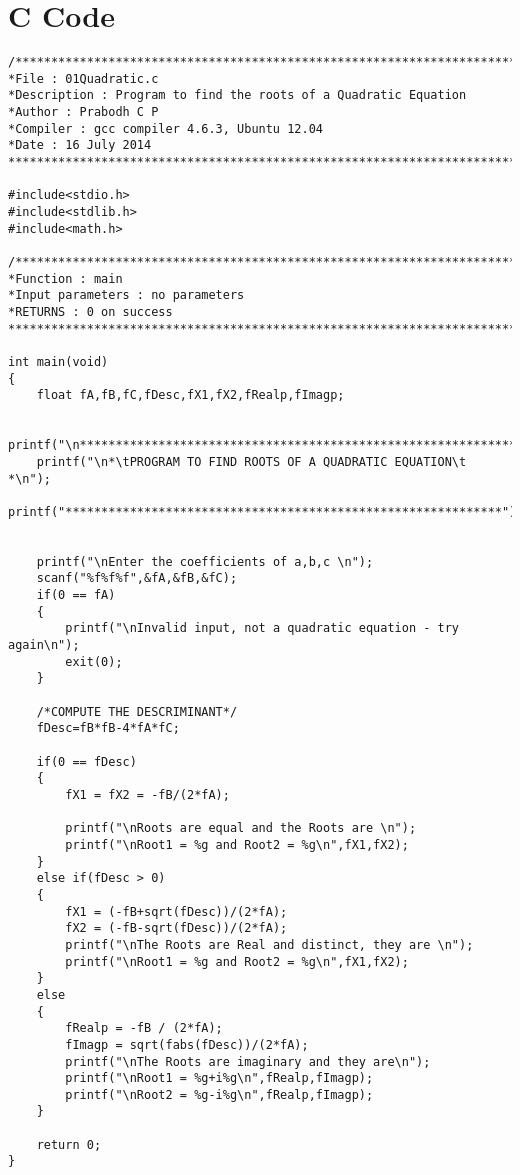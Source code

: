 \documentclass[a4paper]{report}
\begin{document}
\section*{C Code}
\begin{Verbatim}
/***************************************************************************
*File : 01Quadratic.c
*Description : Program to find the roots of a Quadratic Equation
*Author : Prabodh C P
*Compiler : gcc compiler 4.6.3, Ubuntu 12.04
*Date : 16 July 2014
***************************************************************************/

#include<stdio.h>
#include<stdlib.h>
#include<math.h>

/***************************************************************************
*Function : main
*Input parameters : no parameters
*RETURNS : 0 on success
***************************************************************************/

int main(void)
{
	float fA,fB,fC,fDesc,fX1,fX2,fRealp,fImagp;

	printf("\n*************************************************************");
	printf("\n*\tPROGRAM TO FIND ROOTS OF A QUADRATIC EQUATION\t    *\n");
	printf("*************************************************************");


	printf("\nEnter the coefficients of a,b,c \n");
	scanf("%f%f%f",&fA,&fB,&fC);
	if(0 == fA)
	{
		printf("\nInvalid input, not a quadratic equation - try again\n");
		exit(0);
	}

	/*COMPUTE THE DESCRIMINANT*/
	fDesc=fB*fB-4*fA*fC;

	if(0 == fDesc)
	{
		fX1 = fX2 = -fB/(2*fA);

		printf("\nRoots are equal and the Roots are \n");
		printf("\nRoot1 = %g and Root2 = %g\n",fX1,fX2);
	}
	else if(fDesc > 0)
	{
		fX1 = (-fB+sqrt(fDesc))/(2*fA);
		fX2 = (-fB-sqrt(fDesc))/(2*fA);
		printf("\nThe Roots are Real and distinct, they are \n");
		printf("\nRoot1 = %g and Root2 = %g\n",fX1,fX2);
	}
	else
	{
		fRealp = -fB / (2*fA);
		fImagp = sqrt(fabs(fDesc))/(2*fA);
		printf("\nThe Roots are imaginary and they are\n");
		printf("\nRoot1 = %g+i%g\n",fRealp,fImagp);
		printf("\nRoot2 = %g-i%g\n",fRealp,fImagp);
	}

	return 0;
}

\end{Verbatim}
\end{document}
